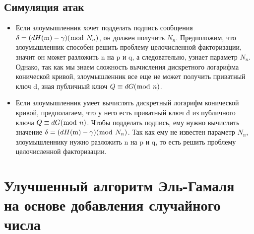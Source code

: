 \documentclass[a4paper]{article}
\begin{document}
\subsection*{Симуляция атак}
\begin{itemize}
    \item Если злоумышленник хочет подделать подпись сообщения $\delta=(dH({\rm m})-\gamma)({\bmod}\ N_{n})$, он должен получить $N_n$. Предположим, что злоумышленник способен решить проблему целочисленной факторизации, значит он может разложить n на p и q, а следовательно, узнает параметр $N_n$. Однако, так как мы знаем сложность вычисления дискретного логарифма конической кривой, злоумышленник все еще не может получить приватный ключ d, зная публичный ключ $Q\equiv dG({\bmod}\ n)$.
    \item Если злоумышленник умеет вычислять дискретный логарифм конической кривой, предполагаем, что у него есть приватный ключ d из публичного ключа  $Q\equiv dG({\bmod}\ n)$. Чтобы подделать подпись, ему нужно вычислить значение $\delta=(dH({\rm m})-\gamma)({\bmod}\ N_{n})$. Так как ему не известен параметр $N_n$, злоумышленнику нужно разложить n на p и q, то есть решить проблему целочисленной факторизации.
\end{itemize}


\section*{Улучшенный алгоритм Эль-Гамаля на основе добавления случайного числа}

\end{document}

